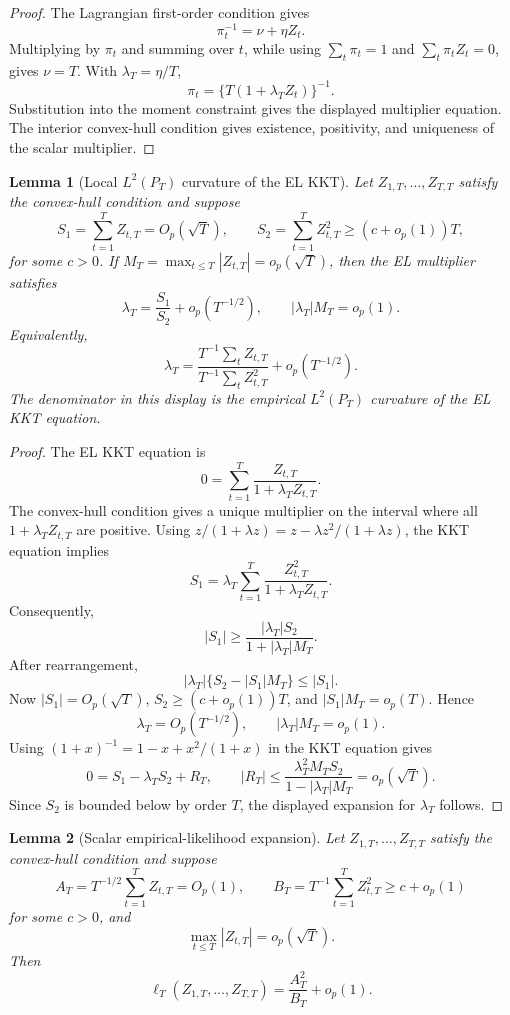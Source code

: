 \documentclass[12pt]{article}
\numberwithin{equation}{section}
\newtheorem{lemma}{Lemma}
\theoremstyle{definition}
\begin{document}
\begin{proof}
The Lagrangian first-order condition gives
\[
    \pi_t^{-1}=\nu+\eta Z_t.
\]
Multiplying by \(\pi_t\) and summing over \(t\), while using
\(\sum_t\pi_t=1\) and \(\sum_t\pi_tZ_t=0\), gives \(\nu=T\). With
\(\lambda_T=\eta/T\),
\[
    \pi_t=\{T(1+\lambda_TZ_t)\}^{-1}.
\]
Substitution into the moment constraint gives the displayed multiplier
equation. The interior convex-hull condition gives existence, positivity, and
uniqueness of the scalar multiplier.
\end{proof}

\begin{lemma}[Local \(L^2(P_T)\) curvature of the EL KKT]
\label{lem:sample-el-local-l2-curvature}
Let \(Z_{1,T},\ldots,Z_{T,T}\) satisfy the convex-hull condition and suppose
\[
    S_1=\sum_{t=1}^TZ_{t,T}=O_p(\sqrt T),
    \qquad
    S_2=\sum_{t=1}^TZ_{t,T}^2\geq(c+o_p(1))T,
\]
for some \(c>0\).  If \(M_T=\max_{t\leq T}|Z_{t,T}|=o_p(\sqrt T)\), then the
EL multiplier satisfies
\[
    \lambda_T=\frac{S_1}{S_2}+o_p(T^{-1/2}),
    \qquad
    |\lambda_T|M_T=o_p(1).
\]
Equivalently,
\[
    \lambda_T
    =
    \frac{T^{-1}\sum_tZ_{t,T}}
         {T^{-1}\sum_tZ_{t,T}^2}
    +o_p(T^{-1/2}).
\]
The denominator in this display is the empirical \(L^2(P_T)\) curvature
of the EL KKT equation.
\end{lemma}

\begin{proof}
The EL KKT equation is
\[
    0=\sum_{t=1}^T\frac{Z_{t,T}}{1+\lambda_TZ_{t,T}}.
\]
The convex-hull condition gives a unique multiplier on the interval where all
\(1+\lambda_TZ_{t,T}\) are positive.  Using
\(z/(1+\lambda z)=z-\lambda z^2/(1+\lambda z)\), the KKT equation implies
\[
    S_1
    =
    \lambda_T\sum_{t=1}^T
      \frac{Z_{t,T}^2}{1+\lambda_TZ_{t,T}}.
\]
Consequently,
\[
    |S_1|
    \geq
    \frac{|\lambda_T|S_2}{1+|\lambda_T|M_T}.
\]
After rearrangement,
\[
    |\lambda_T|\{S_2-|S_1|M_T\}\leq |S_1|.
\]
Now \(|S_1|=O_p(\sqrt T)\), \(S_2\geq(c+o_p(1))T\), and
\(|S_1|M_T=o_p(T)\).  Hence
\[
    \lambda_T=O_p(T^{-1/2}),
    \qquad
    |\lambda_T|M_T=o_p(1).
\]
Using \((1+x)^{-1}=1-x+x^2/(1+x)\) in the KKT equation gives
\[
    0=S_1-\lambda_TS_2+R_T,
    \qquad
    |R_T|
    \leq
    \frac{\lambda_T^2M_TS_2}{1-|\lambda_T|M_T}
    =o_p(\sqrt T).
\]
Since \(S_2\) is bounded below by order \(T\), the displayed expansion for
\(\lambda_T\) follows.
\end{proof}

\begin{lemma}[Scalar empirical-likelihood expansion]
\label{lem:sol-scalar-el}
Let \(Z_{1,T},\ldots,Z_{T,T}\) satisfy the convex-hull condition and suppose
\[
    A_T=T^{-1/2}\sum_{t=1}^TZ_{t,T}=O_p(1),
    \qquad
    B_T=T^{-1}\sum_{t=1}^TZ_{t,T}^2\geq c+o_p(1)
\]
for some \(c>0\), and
\[
    \max_{t\leq T}|Z_{t,T}|=o_p(\sqrt T).
\]
Then
\begin{equation}
    \ell_T(Z_{1,T},\ldots,Z_{T,T})
    =\frac{A_T^2}{B_T}+o_p(1).
    \label{eq:sol-scalar-el-expansion}
\end{equation}
\end{lemma}
\end{document}
